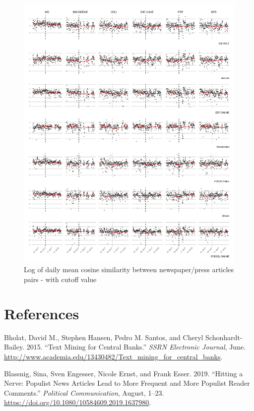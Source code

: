 \documentclass[
]{article}
\begin{document}
\begin{figure}

{\centering \includegraphics[width=0.8\linewidth]{main_text_files/figure-latex/Daily mean cosine similarity - cutoff value-1} 

}

\caption{Log of daily mean cosine similarity between newspaper/press articles pairs - with cutoff value \label{fig:mean_cosine_sim_rd}}\label{fig:Daily mean cosine similarity - cutoff value}
\end{figure}

\newpage

\hypertarget{references}{%
\section*{References}\label{references}}

\hypertarget{refs}{}
\leavevmode\hypertarget{ref-bholat_text_2015}{}%
Bholat, David M., Stephen Hansen, Pedro M. Santos, and Cheryl
Schonhardt-Bailey. 2015. ``Text Mining for Central Banks.'' \emph{SSRN
Electronic Journal}, June.
\url{http://www.academia.edu/13430482/Text_mining_for_central_banks}.

\leavevmode\hypertarget{ref-blassnig_hitting_2019}{}%
Blassnig, Sina, Sven Engesser, Nicole Ernst, and Frank Esser. 2019.
``Hitting a Nerve: Populist News Articles Lead to More Frequent and More
Populist Reader Comments.'' \emph{Political Communication}, August,
1--23. \url{https://doi.org/10.1080/10584609.2019.1637980}.
\end{document}

